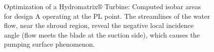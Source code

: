 \begin{figure}[h!]
\begin{minipage}[b]{1\linewidth}
 \centering
\end{minipage}
\caption{Optimization of a Hydromatrix$\circledR$ Turbine: Computed isobar areas for design A operating at the PL point. The streamlines of the water flow, near the shroud region, reveal the negative local incidence angle (flow meets the blade at the suction side), which causes the pumping surface phenomenon. }
\label{design-PL-M}
\end{figure}


